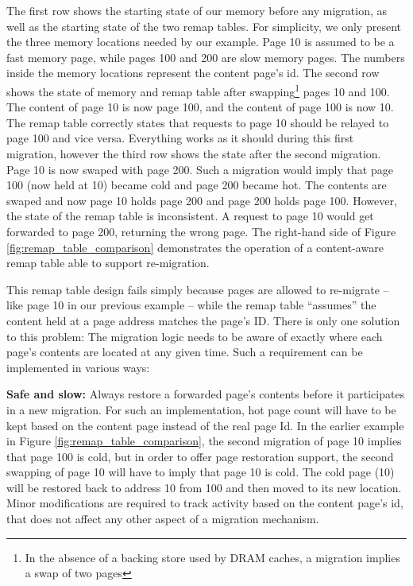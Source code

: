 The first row shows the starting state of our memory before any migration, as well as the starting state of the two remap tables. For simplicity, we only present the three memory locations needed by our example. Page 10 is assumed to be a fast memory page, while pages 100 and 200 are slow memory pages. The numbers inside the memory locations represent the content page's id. The second row shows the state of memory and remap table after swapping\footnote{In the absence of a backing store used by DRAM caches, a migration implies a swap of two pages} pages 10 and 100. The content of page 10 is now page 100, and the content of page 100 is now 10. The remap table correctly states that requests to page 10 should be relayed to page 100 and vice versa.  Everything works as it should during this first migration, however the third row shows the state after the second migration. Page 10 is now swaped with page 200. Such a migration would imply that page 100 (now held at 10) became cold and page 200 became hot. The contents are swaped and now page 10 holds page 200 and page 200 holds page 100. However, the state of the remap table is inconsistent. A request to page 10 would get forwarded to page 200, returning the wrong page. The right-hand side of Figure \ref{fig:remap_table_comparison} demonstrates the operation of a content-aware remap table able to support re-migration.

This remap table design fails simply because pages are allowed to re-migrate -- like page 10 in our previous example -- while the remap table ``assumes'' the content held at a page address matches the page's ID.  There is only one solution to this problem: The migration logic needs to be aware of exactly where each page's contents are located at any given time. Such a requirement can be implemented in various ways:

	\textbf{Safe and slow:} Always restore a forwarded page's contents before it participates in a new migration. For such an implementation, hot page count will have to be kept based on the content page instead of the real page Id. In the earlier example in Figure \ref{fig:remap_table_comparison}, the second migration of page 10 implies that page 100 is cold, but in order to offer page restoration support, the second swapping of page 10 will have to imply that page 10 is cold. The cold page (10) will be restored back to address 10 from 100 and then moved to its new location. Minor modifications are required to track activity based on the content page's id, that does not affect any other aspect of a migration mechanism.

